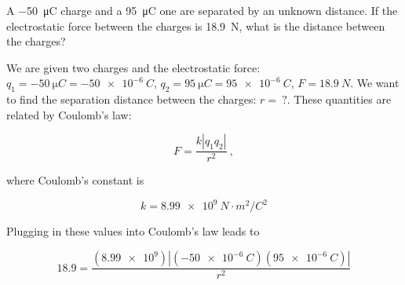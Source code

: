 \documentclass[main.tex]{subfiles}
\begin{document}

\cyanhrule
\clearpage
\begin{example}
    A \SI{-50}{\micro C} charge and a \SI{95}{\micro C} one are separated by an unknown distance. If the electrostatic force between the charges is \SI{18.9}{N}, what is the distance between the charges?
\end{example}

\begin{center}
\end{center}

\Solution We are given two charges and the electrostatic force: $q_1 = \SI{-50}{\micro C} = \qty{-50e-6}{C}$, $q_2 = \SI{95}{\micro C} = \qty{95e-6}{C}$, $F = \SI{18.9}{N}$. We want to find the separation distance between the charges: $r =\ ?$. These quantities are related by Coulomb's law:

\begin{equation*}
    F = \frac{k |q_1 q_2|}{r^2}\ ,
\end{equation*}

where Coulomb's constant is

\begin{equation*}
    k = \SI{8.99e9}{N \cdot m^2/C^2}
\end{equation*}

Plugging in these values into Coulomb's law leads to 

\begin{equation*}
    18.9 = \frac{(\num{8.99e9}) \left|(\qty{-50e-6}{C})(\qty{95e-6}{C})\right|}{r^2}
\end{equation*} 
\end{document}
